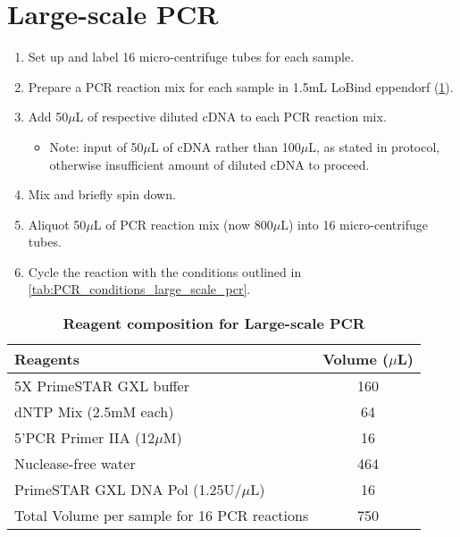 \section{Large-scale PCR} 
\label{Isoseq_Protocol_largescalepcr}
\begin{enumerate}
	\item Set up and label 16 micro-centrifuge tubes for each sample. 
	\item Prepare a PCR reaction mix for each sample in 1.5mL LoBind eppendorf (\cref{tab:large_scale_pcr}).
	\item Add 50$\mu$L of respective diluted cDNA to each PCR reaction mix. 
	\begin{itemize}
		\item Note: input of 50$\mu$L of cDNA rather than 100$\mu$L, as stated in protocol, otherwise insufficient amount of diluted cDNA to proceed.
	\end{itemize}
	\item Mix and briefly spin down.
	\item Aliquot 50$\mu$L of PCR reaction mix (now 800$\mu$L) into 16 micro-centrifuge tubes.
	\item Cycle the reaction with the conditions outlined in \cref{tab:PCR_conditions_large_scale_pcr}.
\end{enumerate}

\vspace{1cm}
\begin{table}[ht]
	\centering
	\caption[Large-scale PCR]%
	{\textbf{Reagent composition for Large-scale PCR}}
	\label{tab:large_scale_pcr}
	\begin{tabularx}{0.8\textwidth}{lc}
		\toprule 
		Reagents                                     & Volume ($\mu$L) \\ \midrule
		5X PrimeSTAR GXL buffer                      & 160         \\
		dNTP Mix (2.5mM each)                        & 64          \\
		5'PCR Primer IIA (12$\mu$M)                      & 16          \\
		Nuclease-free water                          & 464         \\
		PrimeSTAR GXL DNA Pol (1.25U/$\mu$L)             & 16          \\
		Total Volume per sample for 16 PCR reactions & 750 \\
		\bottomrule        
	\end{tabularx}
\end{table}

